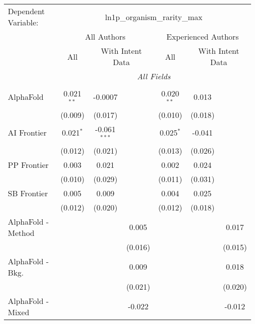 \begingroup
\centering
\begin{tabular}{lcccccc}
   \tabularnewline \midrule \midrule
   Dependent Variable: & \multicolumn{6}{c}{ln1p\_organism\_rarity\_max}\\
 & \multicolumn{3}{c}{All Authors} & \multicolumn{3}{c}{Experienced Authors} \\
\cmidrule(lr){2-4} \cmidrule(lr){5-7}
 & \multicolumn{1}{c}{All} & \multicolumn{2}{c}{With Intent Data} & \multicolumn{1}{c}{All} & \multicolumn{2}{c}{With Intent Data} \\
\cmidrule(lr){2-2} \cmidrule(lr){3-4} \cmidrule(lr){5-5} \cmidrule(lr){6-7}
 & \multicolumn{6}{c}{\textit{All Fields}} \\ \\
   AlphaFold            & 0.021$^{**}$ & -0.0007        &         & 0.020$^{**}$ & 0.013   &   \\   
                        & (0.009)      & (0.017)        &         & (0.010)      & (0.018) &   \\   
   AI Frontier          & 0.021$^{*}$  & -0.061$^{***}$ &         & 0.025$^{*}$  & -0.041  &   \\   
                        & (0.012)      & (0.021)        &         & (0.013)      & (0.026) &   \\   
   PP Frontier          & 0.003        & 0.021          &         & 0.002        & 0.024   &   \\   
                        & (0.010)      & (0.029)        &         & (0.011)      & (0.031) &   \\   
   SB Frontier          & 0.005        & 0.009          &         & 0.004        & 0.025   &   \\   
                        & (0.012)      & (0.020)        &         & (0.012)      & (0.018) &   \\   
   AlphaFold - Method   &              &                & 0.005   &              &         & 0.017\\   
                        &              &                & (0.016) &              &         & (0.015)\\   
   AlphaFold - Bkg.     &              &                & 0.009   &              &         & 0.018\\   
                        &              &                & (0.021) &              &         & (0.020)\\   
   AlphaFold - Mixed    &              &                & -0.022  &              &         & -0.012\\   

\end{tabular}
